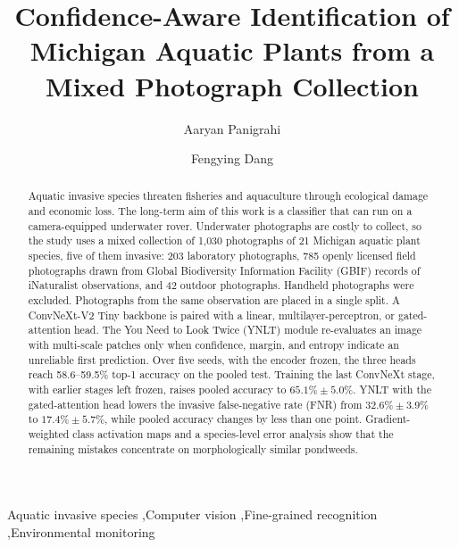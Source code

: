 \documentclass[final,3p,times,twocolumn]{elsarticle}
\begin{document}
\begin{frontmatter}

\title{Confidence-Aware Identification of Michigan Aquatic Plants from a Mixed Photograph Collection}

\author[label1]{Aaryan Panigrahi}
\author[label1]{Fengying Dang}


\address{Fengying Dang (fdang1@mtu.edu) is the corresponding author}
\address[label1]{Department of Electrical and Computer Engineering, Michigan Technological University, Houghton, MI 49931, USA}


\begin{abstract}
Aquatic invasive species threaten fisheries and aquaculture through ecological damage and economic loss. The long-term aim of this work is a classifier that can run on a camera-equipped underwater rover. Underwater photographs are costly to collect, so the study uses a mixed collection of 1{,}030 photographs of 21 Michigan aquatic plant species, five of them invasive: 203 laboratory photographs, 785 openly licensed field photographs drawn from Global Biodiversity Information Facility (GBIF) records of iNaturalist observations, and 42 outdoor photographs. Handheld photographs were excluded. Photographs from the same observation are placed in a single split. A ConvNeXt-V2 Tiny backbone is paired with a linear, multilayer-perceptron, or gated-attention head. The You Need to Look Twice (YNLT) module re-evaluates an image with multi-scale patches only when confidence, margin, and entropy indicate an unreliable first prediction. Over five seeds, with the encoder frozen, the three heads reach 58.6--59.5\% top-1 accuracy on the pooled test. Training the last ConvNeXt stage, with earlier stages left frozen, raises pooled accuracy to \(65.1\% \pm 5.0\%\). YNLT with the gated-attention head lowers the invasive false-negative rate (FNR) from \(32.6\% \pm 3.9\%\) to \(17.4\% \pm 5.7\%\), while pooled accuracy changes by less than one point. Gradient-weighted class activation maps and a species-level error analysis show that the remaining mistakes concentrate on morphologically similar pondweeds.
\end{abstract}

\begin{keyword}
Aquatic invasive species \sep Computer vision \sep Fine-grained recognition \sep Environmental monitoring
\end{keyword}

\end{frontmatter}
\end{document}
